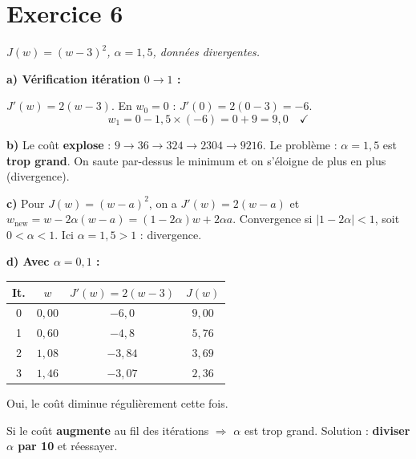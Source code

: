 \section*{Exercice 6 \hfill \exointermediaire}
\textit{$J(w) = (w-3)^2$, $\alpha = 1{,}5$, donn\'{e}es divergentes.}

\separateur

\textbf{a) V\'{e}rification it\'{e}ration $0 \to 1$ :}

$J'(w) = 2(w - 3)$. En $w_0 = 0$ : $J'(0) = 2(0-3) = -6$.
\[
    w_1 = 0 - 1{,}5 \times (-6) = 0 + 9 = \boxed{9{,}0} \quad \checkmark
\]

\textbf{b)} Le co\^{u}t \textbf{explose} : $9 \to 36 \to 324 \to 2304 \to 9216$.
Le probl\`{e}me : $\alpha = 1{,}5$ est \textbf{trop grand}. On saute par-dessus le minimum
et on s'\'{e}loigne de plus en plus (divergence).

\textbf{c)} Pour $J(w) = (w - a)^2$, on a $J'(w) = 2(w-a)$ et
$w_{\text{new}} = w - 2\alpha(w - a) = (1 - 2\alpha)w + 2\alpha a$.
Convergence si $|1 - 2\alpha| < 1$, soit $\boxed{0 < \alpha < 1}$.
Ici $\alpha = 1{,}5 > 1$ : divergence.

\textbf{d) Avec $\alpha = 0{,}1$ :}
\begin{center}
\renewcommand{\arraystretch}{1.2}
\begin{tabular}{c|c|c|c}
    \toprule
    It. & $w$ & $J'(w) = 2(w{-}3)$ & $J(w)$ \\
    \midrule
    0 & $0{,}00$ & $-6{,}0$ & $9{,}00$ \\
    1 & $0{,}60$ & $-4{,}8$ & $5{,}76$ \\
    2 & $1{,}08$ & $-3{,}84$ & $3{,}69$ \\
    3 & $1{,}46$ & $-3{,}07$ & $2{,}36$ \\
    \bottomrule
\end{tabular}
\end{center}

Oui, le co\^{u}t diminue r\'{e}guli\`{e}rement cette fois. \checkmark

\begin{retenirbox}
    Si le co\^{u}t \textbf{augmente} au fil des it\'{e}rations $\Rightarrow$ $\alpha$ est trop grand.
    Solution : \textbf{diviser $\alpha$ par 10} et r\'{e}essayer.
\end{retenirbox}


